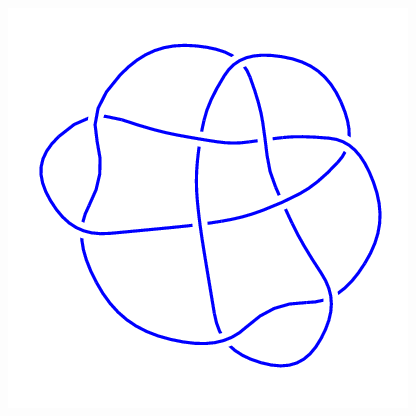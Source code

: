 \begin{figure}[H]
\begin{minipage}[b]{.18\linewidth}
	\end{minipage}
	\begin{minipage}[b]{.18\linewidth}
		\centering
		\includegraphics[width=\linewidth]{../data/10_116.png}
	\end{minipage}
\end{figure}
